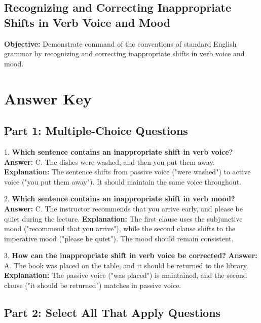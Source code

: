 \documentclass[12pt]{article}
\begin{document}
\subsection*{Recognizing and Correcting Inappropriate Shifts in Verb Voice and Mood}
\onehalfspacing

\begin{tcolorbox}[colframe=black!40, colback=gray!0, title=Learning Objective]
\textbf{Objective:} Demonstrate command of the conventions of standard English grammar by recognizing and correcting inappropriate shifts in verb voice and mood.
\end{tcolorbox}  

\section*{Answer Key}

\subsection*{Part 1: Multiple-Choice Questions}

1. \textbf{Which sentence contains an inappropriate shift in verb voice?}  
\textbf{Answer:} C. The dishes were washed, and then you put them away.  
\textbf{Explanation:} The sentence shifts from passive voice ("were washed") to active voice ("you put them away"). It should maintain the same voice throughout.

\vspace{1cm}
2. \textbf{Which sentence contains an inappropriate shift in verb mood?}  
\textbf{Answer:} C. The instructor recommends that you arrive early, and please be quiet during the lecture.  
\textbf{Explanation:} The first clause uses the subjunctive mood ("recommend that you arrive"), while the second clause shifts to the imperative mood ("please be quiet"). The mood should remain consistent.

\vspace{1cm}
3. \textbf{How can the inappropriate shift in verb voice be corrected?}  
\textbf{Answer:} A. The book was placed on the table, and it should be returned to the library.  
\textbf{Explanation:} The passive voice ("was placed") is maintained, and the second clause ("it should be returned") matches in passive voice.

\subsection*{Part 2: Select All That Apply Questions}
\end{document}
